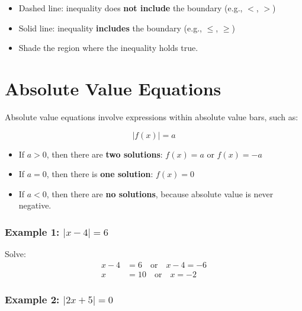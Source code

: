 \documentclass[11pt]{article}
\begin{document}
\begin{tcolorbox}[colback=orange!5!white, colframe=orange!80!black, title=Tips]
\begin{itemize}
  \item Dashed line: inequality does \textbf{not include} the boundary (e.g., \( < \), \( > \))
  \item Solid line: inequality \textbf{includes} the boundary (e.g., \( \leq \), \( \geq \))
  \item Shade the region where the inequality holds true.
\end{itemize}
\end{tcolorbox}

\section{Absolute Value Equations}

Absolute value equations involve expressions within absolute value bars, such as:

\[
|f(x)| = a
\]

\begin{tcolorbox}[colback=blue!5!white, colframe=blue!75!black, title=General Cases]
\begin{itemize}
  \item If \( a > 0 \), then there are \textbf{two solutions}: \( f(x) = a \) or \( f(x) = -a \)
  \item If \( a = 0 \), then there is \textbf{one solution}: \( f(x) = 0 \)
  \item If \( a < 0 \), then there are \textbf{no solutions}, because absolute value is never negative.
\end{itemize}
\end{tcolorbox}

\subsubsection*{Example 1: \( |x - 4| = 6 \)}

Solve:
\begin{align*}
x - 4 &= 6 \quad \text{or} \quad x - 4 = -6 \\
x &= 10 \quad \text{or} \quad x = -2
\end{align*}

\subsubsection*{Example 2: \( |2x + 5| = 0 \)}
\end{document}

